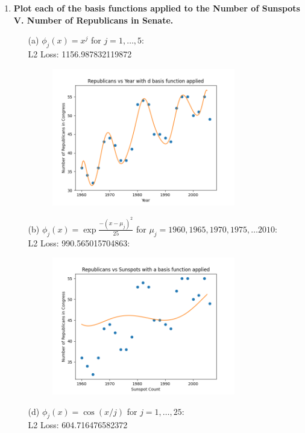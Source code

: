 \documentclass[submit]{harvardml}
\begin{document}
\begin{enumerate}
    \item \textbf{Plot each of the basis functions applied to the Number of Sunspots V. Number of Republicans in Senate.}
    \begin{enumerate}
    	\item[(a)] $\phi_j(x) = x^j$ for $j=1, \ldots, 5$:\\
    	L2 Loss:  1156.987832119872 \\
    	\begin{figure}[H]
            \includegraphics[width=8cm]{hw1/T1P4_plots/plot4.png}
            \centering
        \end{figure}
        \item[(b)] $\phi_j(x) = \exp{\frac{-(x-\mu_j)^2}{25}}$ for $\mu_j=1960, 1965, 1970, 1975, \ldots 2010$: \\
        L2 Loss:  990.565015704863:\\
        \begin{figure}[H]
            \includegraphics[width=8cm]{hw1/T1P4_plots/plot5.png}
            \centering
        \end{figure}
    	\item[(d)] $\phi_j(x) = \cos(x / j)$ for $j=1, \ldots, 25$: \\
    	L2 Loss:  604.716476582372 \\
    	\begin{figure}[H]

\end{figure}
\end{enumerate}
\end{enumerate}
\end{document}
